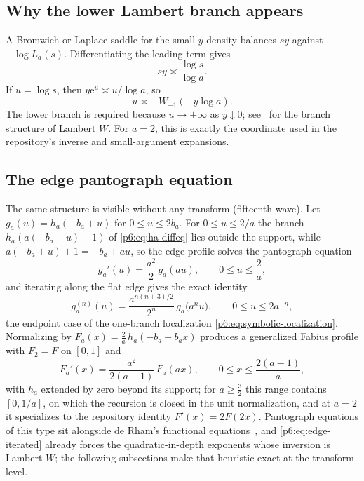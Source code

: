 \documentclass[11pt,oneside]{article}
\numberwithin{equation}{section}
\theoremstyle{definition}
\theoremstyle{remark}
\newcommand{\e}{\mathrm e}
\begin{document}
\subsection{Why the lower Lambert branch appears}

A Bromwich or Laplace saddle for the small-$y$ density balances
$sy$ against $-\log L_a(s)$.  Differentiating the leading term gives
\begin{equation}\label{p6:eq:saddle-balance}
 sy\asymp\frac{\log s}{\log a}.
\end{equation}
If $u=\log s$, then $y\e^u\asymp u/\log a$, so
\begin{equation}\label{p6:eq:Lambert-coordinate}
 u\asymp-W_{-1}(-y\log a).
\end{equation}
The lower branch is required because $u\to+\infty$ as $y\downarrow0$; see~\cite{p6:corless} for the branch structure of Lambert $W$.
For $a=2$, this is exactly the coordinate used in the repository's inverse and
small-argument expansions.

\subsection{The edge pantograph equation}

The same structure is visible without any transform (fifteenth wave).  Let
$g_a(u)=h_a(-b_a+u)$ for $0\le u\le2b_a$.  For $0\le u\le2/a$ the branch
$h_a(a(-b_a+u)-1)$ of \eqref{p6:eq:ha-diffeq} lies outside the support, while
$a(-b_a+u)+1=-b_a+au$, so the edge profile solves the pantograph equation
\begin{equation}\label{p6:eq:edge-pantograph}
 g_a'(u)=\frac{a^2}{2}\,g_a(au),
 \qquad 0\le u\le\frac2a,
\end{equation}
and iterating along the flat edge gives the exact identity
\begin{equation}\label{p6:eq:edge-iterated}
 g_a^{(n)}(u)=\frac{a^{n(n+3)/2}}{2^n}\,g_a\bigl(a^nu\bigr),
 \qquad 0\le u\le2a^{-n},
\end{equation}
the endpoint case of the one-branch localization
\eqref{p6:eq:symbolic-localization}.  Normalizing by
$F_a(x)=\tfrac2a\,h_a(-b_a+b_ax)$ produces a generalized Fabius profile with
$F_2=F$ on $[0,1]$ and
\begin{equation}\label{p6:eq:Fa-pantograph}
 F_a'(x)=\frac{a^2}{2(a-1)}\,F_a(ax),
 \qquad 0\le x\le\frac{2(a-1)}{a},
\end{equation}
with $h_a$ extended by zero beyond its support; for $a\ge\tfrac32$ this range
contains $[0,1/a]$, on which the recursion is closed in the unit
normalization, and at $a=2$ it specializes to the repository identity
$F'(x)=2F(2x)$.
Pantograph equations of this type sit alongside de Rham's functional
equations~\cite{p6:derham}, and \eqref{p6:eq:edge-iterated} already forces the
quadratic-in-depth exponents whose inversion is Lambert-$W$; the following
subsections make that heuristic exact at the transform level.
\end{document}
